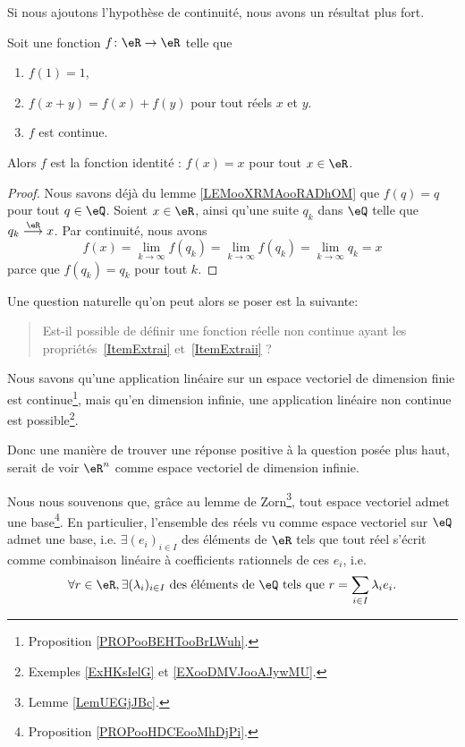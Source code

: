 Si nous ajoutons l'hypothèse de continuité, nous avons un résultat plus fort.
\begin{lemma}        \label{LEMooYKCUooUiIvPJ}
    Soit une fonction \( f\colon \eR\to \eR\) telle que
    \begin{enumerate}

        \item	
            \( f(1)=1\),

        \item	
            \( f(x+y)=f(x)+f(y)\) pour tout réels \( x\) et \( y\).
        \item
            \( f\) est continue.
    \end{enumerate}
    Alors \( f\) est la fonction identité : \( f(x)=x\) pour tout \( x\in \eR\).
\end{lemma}

\begin{proof}
    Nous savons déjà du lemme \ref{LEMooXRMAooRADhOM} que \( f(q)=q\) pour tout \( q\in \eQ\). Soient \( x\in \eR\), ainsi qu'une suite \( q_k\) dans \( \eQ\) telle que \( q_k\stackrel{\eR}{\longrightarrow}x\). Par continuité, nous avons 
    \begin{equation}
        f(x)=\lim_{k\to \infty} f(q_k)= \lim_{k\to \infty} f(q_k)=\lim_{k\to \infty} q_k=x
    \end{equation}
    parce que \( f(q_k)=q_k\) pour tout \( k\).
\end{proof}

Une question naturelle qu'on peut alors se poser est la suivante:
\begin{quote}
	Est-il possible de définir une fonction réelle non continue ayant les propriétés~\ref{ItemExtrai} et~\ref{ItemExtraii} ?
\end{quote}

Nous savons qu'une application linéaire sur un espace vectoriel de dimension finie est continue\footnote{Proposition \ref{PROPooBEHTooBrLWuh}.}, mais qu'en dimension infinie, une application linéaire non continue est possible\footnote{Exemples \ref{ExHKsIelG} et \ref{EXooDMVJooAJywMU}.}.

Donc une manière de trouver une réponse positive à la question posée plus haut, serait de voir \( \eR^n\) comme espace vectoriel de dimension infinie. 

Nous nous souvenons que, grâce au lemme de Zorn\footnote{Lemme \ref{LemUEGjJBc}.}, tout espace vectoriel admet une base\footnote{Proposition \ref{PROPooHDCEooMhDjPi}.}. En particulier, l'ensemble des réels vu comme espace vectoriel sur \( \eQ\) admet une base, i.e. \( \exists (e_i)_{i\in I}\)  des éléments de \( \eR\) tels que tout réel s'écrit comme combinaison linéaire à coefficients rationnels  de ces \( e_i\), i.e.
\begin{equation}
	\forall r \in \eR, \exists (\lambda_i)_{i\in I} \text{ des éléments de } \eQ \text{ tels que  } r = \sum_{i\in I} \lambda_i e_i.
\end{equation}


